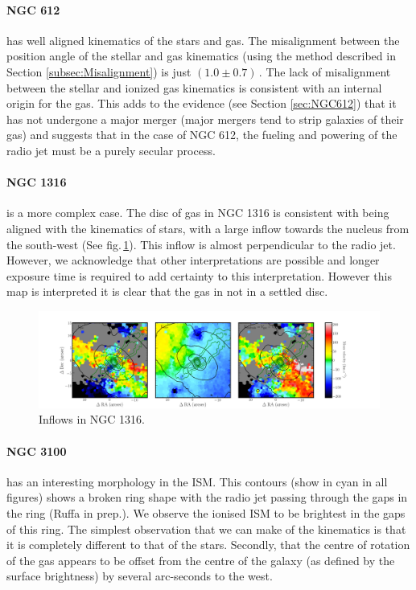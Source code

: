 	\paragraph{NGC 612} has well aligned kinematics of the stars and gas. The misalignment between the position angle of the stellar and gas kinematics (using the method described in Section \ref{subsec:Misalignment}) is just $(1.0\pm0.7)$\,\degree. The lack of misalignment between the stellar and ionized gas kinematics is consistent with an internal origin for the gas. This adds to the evidence (see Section \ref{sec:NGC612}) that it has not undergone a major merger (major mergers tend to strip galaxies of their gas) and suggests that in the case of NGC 612, the fueling and powering of the radio jet must be a purely secular process. 


	\paragraph{NGC 1316} is a more complex case. The disc of gas in NGC 1316 is consistent with being aligned with the kinematics of stars, with a large inflow towards the nucleus from the south-west (See fig.\,\ref{fig:Inflow}). This inflow is almost perpendicular to the radio jet. However, we acknowledge that other interpretations are possible and longer exposure time is required to add certainty to this interpretation. However this map is interpreted it is clear that the gas in not in a settled disc. 

	\begin{figure}
		\centering
		\includegraphics[width=\textwidth]{chapter5/ngc1316_inflow.png}
		\caption[Inflows in NGC 1316]{Inflows in NGC 1316.} 
		\label{fig:Inflow}
	\end{figure}


	\paragraph{NGC 3100} has an interesting morphology in the ISM. This  contours (show in cyan in all figures) shows a broken ring shape with the radio jet passing through the gaps in the ring (Ruffa in prep.). We observe the ionised ISM to be brightest in the gaps of this ring. The simplest observation that we can make of the kinematics is that it is completely different to that of the stars. Secondly, that the centre of rotation of the gas appears to be offset from the centre of the galaxy (as defined by the surface brightness) by several arc-seconds to the west. 

